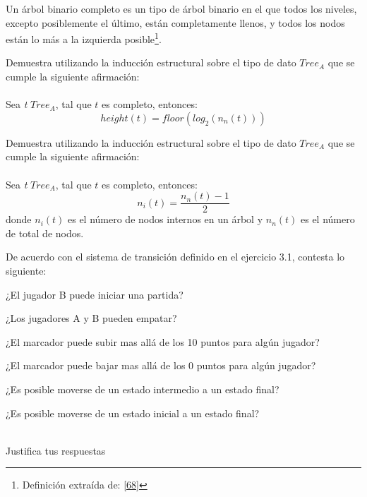 	\begin{definition}
Un árbol binario completo es un tipo de árbol binario en el que todos los niveles, excepto posiblemente el último, están completamente llenos, y todos los nodos están lo más a la izquierda posible\footnote{Definición extraída de: \hyperlink{68}{[68]}}.
	\end{definition}

    \begin{exercise}
        Demuestra utilizando la inducción estructural sobre el tipo de dato $Tree_{A}$ que se cumple la siguiente afirmación:\\\\
        Sea \textit{t} $Tree_{A}$, tal que $t$ es completo, entonces:
        \[ height(t) = floor(log_{2}(n_n(t)))\]
    \end{exercise}

    \begin{exercise}
Demuestra utilizando la inducción estructural sobre el tipo de dato $Tree_{A}$ que se cumple la siguiente afirmación:\\\\
        Sea \textit{t} $Tree_{A}$, tal que $t$ es completo, entonces:
        \[   n_i(t) = \frac{n_n(t) - 1}{2} \] donde $n_i(t)$ es el número de nodos internos en un árbol y $n_n(t)$ es el número de total de nodos.
    \end{exercise}

    \begin{exercise}
        De acuerdo con el sistema de transición definido en el ejercicio 3.1, contesta lo siguiente: 
	\begin{item}
		\item ¿El jugador B puede iniciar una partida?
		\item ¿Los jugadores A y B pueden empatar?
		\item ¿El marcador puede subir mas allá de los 10 puntos para algún jugador?
		\item ¿El marcador puede bajar mas allá de los 0 puntos para algún jugador?
		\item ¿Es posible moverse de un estado intermedio a un estado final?
		\item ¿Es posible moverse de un estado inicial a un estado final?\\\\
 	\end{item}	
        Justifica tus respuestas
    \end{exercise}

